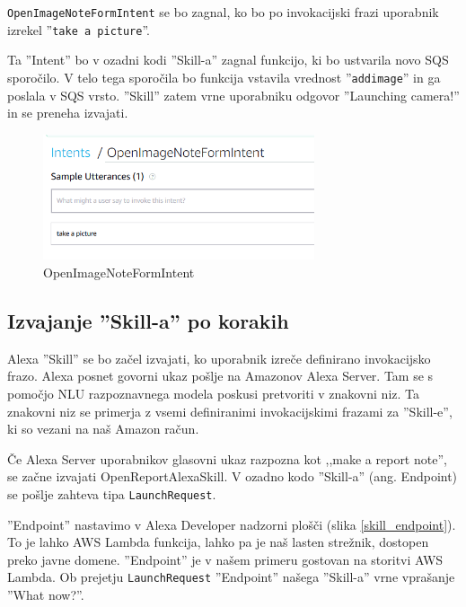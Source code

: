\documentclass[a4paper, 12pt]{book}
\begin{document}
\texttt{OpenImageNoteFormIntent} se bo zagnal, ko bo po invokacijski frazi uporabnik izrekel ''\texttt{take a picture}''.

Ta ''Intent'' bo v ozadni kodi ''Skill-a'' zagnal funkcijo, ki bo ustvarila novo SQS sporočilo.
V telo tega sporočila bo funkcija vstavila vrednost ''\texttt{addimage}'' in ga poslala v SQS vrsto.
''Skill'' zatem vrne uporabniku odgovor ''Launching camera!'' in se preneha izvajati.

\begin{figure}[H]
\begin{center}
\includegraphics[width=8cm]{intent_image}
\end{center}
\caption{OpenImageNoteFormIntent}
\label{OpenImageNoteFormIntent}
\end{figure}

\subsection{Izvajanje ''Skill-a'' po korakih}

Alexa ''Skill'' se bo začel izvajati, ko uporabnik izreče definirano invokacijsko frazo.
Alexa posnet govorni ukaz pošlje na Amazonov Alexa Server.
Tam se s pomočjo NLU razpoznavnega modela poskusi pretvoriti v znakovni niz.
Ta znakovni niz se primerja z vsemi definiranimi invokacijskimi frazami za ''Skill-e'', ki so vezani na naš Amazon račun.

Če Alexa Server uporabnikov glasovni ukaz razpozna kot ,,make a report note'', se začne izvajati OpenReportAlexaSkill.
V ozadno kodo ''Skill-a'' (ang. Endpoint) se pošlje zahteva tipa \texttt{LaunchRequest}.

''Endpoint'' nastavimo v Alexa Developer nadzorni plošči (slika \ref{skill_endpoint}).
To je lahko AWS Lambda funkcija, lahko pa je naš lasten strežnik, dostopen preko javne domene.
''Endpoint'' je v našem primeru gostovan na storitvi AWS Lambda.
Ob prejetju \texttt{LaunchRequest} ''Endpoint'' našega ''Skill-a'' vrne vprašanje ''What now?''.
\end{document}
